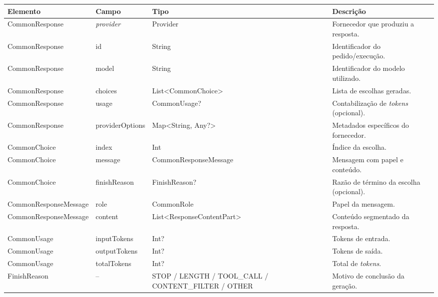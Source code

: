         \begin{table}[H]
    \centering
    \scriptsize
    \setlength{\tabcolsep}{4pt}
    \renewcommand{\arraystretch}{1.2}
    \begin{tabularx}{\textwidth}{|>{\raggedright\arraybackslash}p{3.4cm}|>{\raggedright\arraybackslash}p{2.2cm}|>{\raggedright\arraybackslash}p{3.8cm}|>{\raggedright\arraybackslash}X|}
        \hline
        \textbf{Elemento} & \textbf{Campo} & \textbf{Tipo} & \textbf{Descrição} \\ \hline

        CommonResponse & \textit{provider} & Provider & Fornecedor que produziu a resposta. \\ \hline
        CommonResponse & id & String & Identificador do pedido/execução. \\ \hline
        CommonResponse & model & String & Identificador do modelo utilizado. \\ \hline
        CommonResponse & choices & List<CommonChoice> & Lista de escolhas geradas. \\ \hline
        CommonResponse & usage & CommonUsage? & Contabilização de \textit{tokens} (opcional). \\ \hline
        CommonResponse & providerOptions & Map<String, Any?> & Metadados específicos do fornecedor. \\ \hline

        CommonChoice & index & Int & Índice da escolha. \\ \hline
        CommonChoice & message & CommonResponseMessage & Mensagem com papel e conteúdo. \\ \hline
        CommonChoice & finishReason & FinishReason? & Razão de término da escolha (opcional). \\ \hline

        CommonResponseMessage & role & CommonRole & Papel da mensagem. \\ \hline
        CommonResponseMessage & content & List<ResponseContentPart> & Conteúdo segmentado da resposta. \\ \hline

        CommonUsage & inputTokens & Int? & Tokens de entrada. \\ \hline
        CommonUsage & outputTokens & Int? & Tokens de saída. \\ \hline
        CommonUsage & totalTokens & Int? & Total de \textit{tokens}. \\ \hline

        FinishReason & -- & STOP / LENGTH / \newline TOOL\_CALL / \newline CONTENT\_FILTER / \newline OTHER & Motivo de conclusão da geração. \\ \hline


\end{tabularx}
\end{table}
